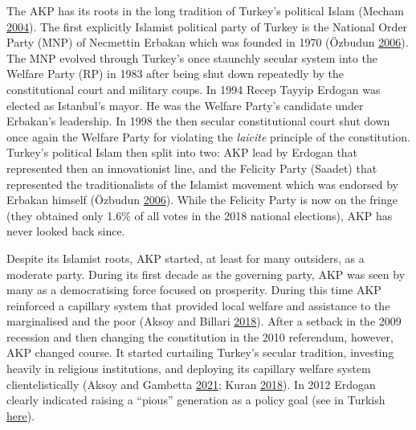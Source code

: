 \documentclass[
  12pt,
]{article}
\begin{document}
The AKP has its roots in the long tradition of Turkey's political Islam (Mecham \protect\hyperlink{ref-mecham2004ashes}{2004}). The first explicitly Islamist political party of Turkey is the National Order Party (MNP) of Necmettin Erbakan which was founded in 1970 (Özbudun \protect\hyperlink{ref-ozbudun2006political}{2006}). The MNP evolved through Turkey's once staunchly secular system into the Welfare Party (RP) in 1983 after being shut down repeatedly by the constitutional court and military coups. In 1994 Recep Tayyip Erdogan was elected as Istanbul's mayor. He was the Welfare Party's candidate under Erbakan's leadership. In 1998 the then secular constitutional court shut down once again the Welfare Party for violating the \emph{laicite} principle of the constitution. Turkey's political Islam then split into two: AKP lead by Erdogan that represented then an innovationist line, and the Felicity Party (Saadet) that represented the traditionalists of the Islamist movement which was endorsed by Erbakan himself (Özbudun \protect\hyperlink{ref-ozbudun2006political}{2006}). While the Felicity Party is now on the fringe (they obtained only 1.6\% of all votes in the 2018 national elections), AKP has never looked back since.

Despite its Islamist roots, AKP started, at least for many outsiders, as a moderate party. During its first decade as the governing party, AKP was seen by many as a democratising force focused on prosperity. During this time AKP reinforced a capillary system that provided local welfare and assistance to the marginalised and the poor (Aksoy and Billari \protect\hyperlink{ref-aksoy2018political}{2018}). After a setback in the 2009 recession and then changing the constitution in the 2010 referendum, however, AKP changed course. It started curtailing Turkey's secular tradition, investing heavily in religious institutions, and deploying its capillary welfare system clientelistically (Aksoy and Gambetta \protect\hyperlink{ref-AG21}{2021}; Kuran \protect\hyperlink{ref-kuran2018islam}{2018}). In 2012 Erdogan clearly indicated raising a ``pious'' generation as a policy goal (see in Turkish \href{https://www.haberler.com/modern-dindar-bir-genclikten-bahsediyorum-3375053-haberi/}{here}).
\end{document}
